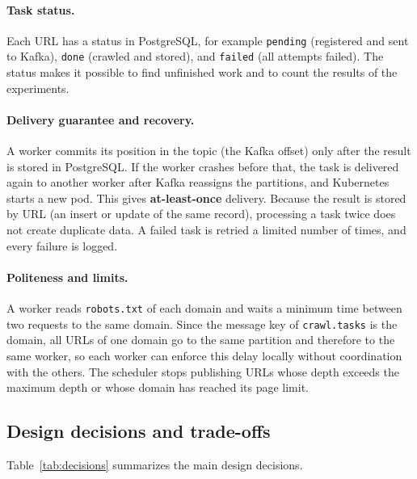 \paragraph{Task status.} Each URL has a status in PostgreSQL, for example \texttt{pending} (registered and sent to Kafka), \texttt{done} (crawled and stored), and \texttt{failed} (all attempts failed). The status makes it possible to find unfinished work and to count the results of the experiments.

\paragraph{Delivery guarantee and recovery.} A worker commits its position in the topic (the Kafka offset) only after the result is stored in PostgreSQL. If the worker crashes before that, the task is delivered again to another worker after Kafka reassigns the partitions, and Kubernetes starts a new pod. This gives \textbf{at-least-once} delivery. Because the result is stored by URL (an insert or update of the same record), processing a task twice does not create duplicate data. A failed task is retried a limited number of times, and every failure is logged.

\paragraph{Politeness and limits.} A worker reads \texttt{robots.txt} of each domain and waits a minimum time between two requests to the same domain. Since the message key of \texttt{crawl.tasks} is the domain, all URLs of one domain go to the same partition and therefore to the same worker, so each worker can enforce this delay locally without coordination with the others. The scheduler stops publishing URLs whose depth exceeds the maximum depth or whose domain has reached its page limit.




\subsection{Design decisions and trade-offs}
Table~\ref{tab:decisions} summarizes the main design decisions.


